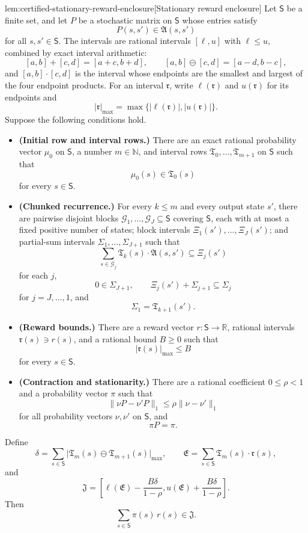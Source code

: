 \begin{lemmav}{lem:certified-stationary-reward-enclosure}[Stationary reward enclosure]
Let \(\mathsf S\) be a finite set, and let \(P\) be a stochastic matrix on \(\mathsf S\) whose entries satisfy
\[
P(s,s')\in\mathfrak A(s,s')
\]
for all \(s,s'\in\mathsf S\). The intervals are rational intervals \([\ell,u]\) with \(\ell\le u\), combined by exact interval arithmetic:
\[
[a,b]+[c,d]=[a+c,b+d],\qquad
[a,b]\ominus[c,d]=[a-d,b-c],
\]
and \([a,b]\cdot[c,d]\) is the interval whose endpoints are the smallest and largest of the four endpoint products. For an interval \(\mathfrak r\), write \(\ell(\mathfrak r)\) and \(u(\mathfrak r)\) for its endpoints and
\[
|\mathfrak r|_{\max}=\max\{|\ell(\mathfrak r)|,|u(\mathfrak r)|\}.
\]
Suppose the following conditions hold.
\begin{itemize}
\item \textbf{(Initial row and interval rows.)} There are an exact rational probability vector \(\mu_0\) on \(\mathsf S\), a number \(m\in\mathbb N\), and interval rows \(\mathfrak T_0,\ldots,\mathfrak T_{m+1}\) on \(\mathsf S\) such that
\[
\mu_0(s)\in\mathfrak T_0(s)
\]
for every \(s\in\mathsf S\).

\item \textbf{(Chunked recurrence.)} For every \(k\le m\) and every output state \(s'\), there are pairwise disjoint blocks \(\mathcal G_1,\ldots,\mathcal G_J\subseteq\mathsf S\) covering \(\mathsf S\), each with at most a fixed positive number of states; block intervals \(\Xi_1(s'),\ldots,\Xi_J(s')\); and partial-sum intervals \(\Sigma_1,\ldots,\Sigma_{J+1}\) such that
\[
\sum_{s\in\mathcal G_j}\mathfrak T_k(s)\cdot\mathfrak A(s,s')\subseteq\Xi_j(s')
\]
for each \(j\),
\[
0\in\Sigma_{J+1},\qquad
\Xi_j(s')+\Sigma_{j+1}\subseteq\Sigma_j
\]
for \(j=J,\ldots,1\), and
\[
\Sigma_1=\mathfrak T_{k+1}(s').
\]

\item \textbf{(Reward bounds.)} There are a reward vector \(r:\mathsf S\to\mathbb R\), rational intervals \(\mathfrak r(s)\ni r(s)\), and a rational bound \(B\ge0\) such that
\[
|\mathfrak r(s)|_{\max}\le B
\]
for every \(s\in\mathsf S\).

\item \textbf{(Contraction and stationarity.)} There are a rational coefficient \(0\le\rho<1\) and a probability vector \(\pi\) such that
\[
\|\nu P-\nu'P\|_1\le\rho\|\nu-\nu'\|_1
\]
for all probability vectors \(\nu,\nu'\) on \(\mathsf S\), and
\[
\pi P=\pi .
\]
\end{itemize}
Define
\[
\delta=\sum_{s\in\mathsf S}\bigl|\mathfrak T_m(s)\ominus\mathfrak T_{m+1}(s)\bigr|_{\max},
\qquad
\mathfrak E=\sum_{s\in\mathsf S}\mathfrak T_m(s)\cdot\mathfrak r(s),
\]
and
\[
\mathfrak J=
\left[
\ell(\mathfrak E)-\frac{B\delta}{1-\rho},
u(\mathfrak E)+\frac{B\delta}{1-\rho}
\right].
\]
Then
\[
\sum_{s\in\mathsf S}\pi(s)\,r(s)\in\mathfrak J .
\]
\end{lemmav}

